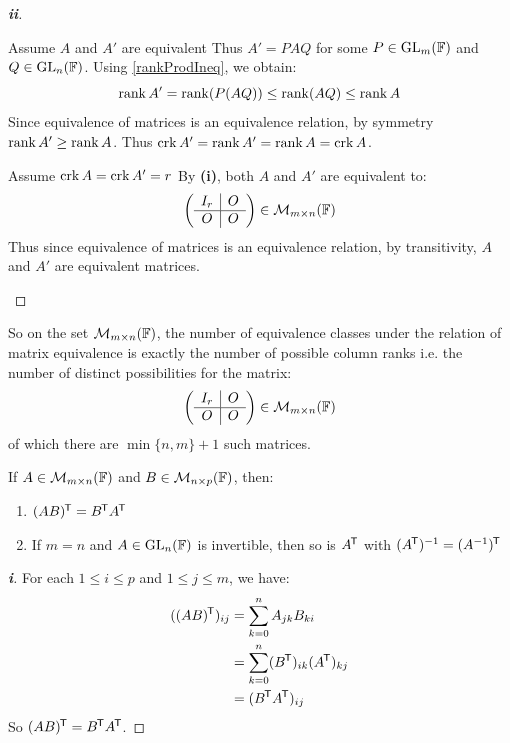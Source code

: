 \documentclass[../main.tex]{subfiles}
\begin{document}
\begin{proof}[\textbf{ii}]
  \begin{proofdirection}{Assume $A$ and $A'$ are equivalent}
    Thus $A' = PAQ$ for some $P \in \mathrm{GL}_m(\mathbb{F})$ and $Q \in \mathrm{GL}_n(\mathbb{F})$.
    Using \cref{rankProdIneq}, we obtain:
    \[
      \operatorname{rank} A' = \operatorname{rank} (P(AQ)) \leq \operatorname{rank}(AQ) \leq \operatorname{rank} A
    \]
    Since equivalence of matrices is an equivalence relation, by symmetry $\operatorname{rank} A' \geq \operatorname{rank} A$.
    Thus $\operatorname{crk} A' = \operatorname{rank} A' = \operatorname{rank} A = \operatorname{crk} A$.
  \end{proofdirection}
  \begin{proofdirection}{Assume $\operatorname{crk} A = \operatorname{crk} A' = r$}
    By \textbf{(i)}, both $A$ and $A'$ are equivalent to:
    \[
      \left(\begin{array}{c|c}
      I_r & O \\ \hline
      O & O
      \end{array}\right) \in \mathcal{M}_{m \times n}(\mathbb{F})
    \]
    Thus since equivalence of matrices is an equivalence relation, by transitivity, $A$ and $A'$ are equivalent matrices.
  \end{proofdirection}
\end{proof}
\begin{remark}
  So on the set $\mathcal{M}_{m \times n}(\mathbb{F})$, the number of equivalence classes under the relation of matrix equivalence is exactly the number of possible column ranks i.e. the number of distinct possibilities for the matrix:
  \[
    \left(\begin{array}{c|c}
    I_r & O \\ \hline
    O & O
    \end{array}\right) \in \mathcal{M}_{m \times n}(\mathbb{F})
  \]
  of which there are $\min\{n, m\} + 1$ such matrices.
\end{remark}
\begin{lemma}
  If $A \in \mathcal{M}_{m \times n}(\mathbb{F})$ and $B \in \mathcal{M}_{n \times p}(\mathbb{F})$, then: \label{TProp}
  \begin{enumerate}
    \item $(AB)^{{\mkern-1.5mu\mathsf{T}}} = B^{{\mkern-1.5mu\mathsf{T}}} A^{{\mkern-1.5mu\mathsf{T}}}$
    \item If $m = n$ and $A \in \mathrm{GL}_n(\mathbb{F})$ is invertible, then so is $A^{{\mkern-1.5mu\mathsf{T}}}$ with $(A^{{\mkern-1.5mu\mathsf{T}}})^{-1} = (A^{-1})^{{\mkern-1.5mu\mathsf{T}}}$
  \end{enumerate}
\end{lemma}
\begin{proof}[\textbf{i}]
  For each $1 \leq i \leq p$ and $1 \leq j \leq m$, we have:
  \begin{align*}
    ((AB)^{{\mkern-1.5mu\mathsf{T}}})_{i j} &= \sum_{k = 0}^{n} A_{j k}B_{k i} \\
                          &= \sum_{k = 0}^{n} (B^{{\mkern-1.5mu\mathsf{T}}})_{i k}(A^{{\mkern-1.5mu\mathsf{T}}})_{k j} \\
                          &= (B^{{\mkern-1.5mu\mathsf{T}}} A^{{\mkern-1.5mu\mathsf{T}}})_{i j}
  \end{align*}
  So $(AB)^{{\mkern-1.5mu\mathsf{T}}} = B^{{\mkern-1.5mu\mathsf{T}}} A^{{\mkern-1.5mu\mathsf{T}}}$.
\end{proof}
\end{document}
